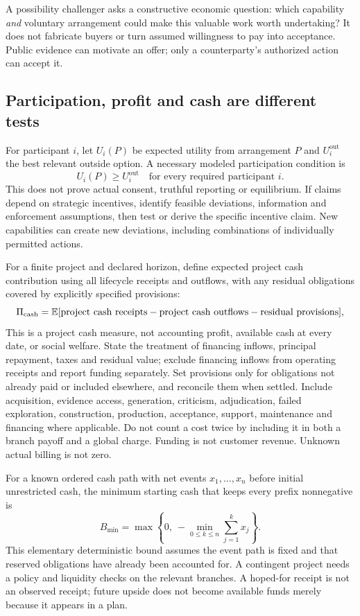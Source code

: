 A possibility challenger asks a constructive economic question: which capability \emph{and} voluntary arrangement could make this valuable work worth undertaking? It does not fabricate buyers or turn assumed willingness to pay into acceptance. Public evidence can motivate an offer; only a counterparty's authorized action can accept it.

\subsection{Participation, profit and cash are different tests}
For participant $i$, let $U_i(P)$ be expected utility from arrangement $P$ and $U_i^{\mathrm{out}}$ the best relevant outside option. A necessary modeled participation condition is
\begin{equation}
U_i(P)\geq U_i^{\mathrm{out}}\quad\text{for every required participant }i.
\end{equation}
This does not prove actual consent, truthful reporting or equilibrium. If claims depend on strategic incentives, identify feasible deviations, information and enforcement assumptions, then test or derive the specific incentive claim. New capabilities can create new deviations, including combinations of individually permitted actions.

For a finite project and declared horizon, define expected project cash contribution using all lifecycle receipts and outflows, with any residual obligations covered by explicitly specified provisions:
\begin{equation}
\Pi_{\mathrm{cash}}=\mathbb{E}[\text{project cash receipts}-\text{project cash outflows}-\text{residual provisions}],
\end{equation}
This is a project cash measure, not accounting profit, available cash at every date, or social welfare. State the treatment of financing inflows, principal repayment, taxes and residual value; exclude financing inflows from operating receipts and report funding separately. Set provisions only for obligations not already paid or included elsewhere, and reconcile them when settled. Include acquisition, evidence access, generation, criticism, adjudication, failed exploration, construction, production, acceptance, support, maintenance and financing where applicable. Do not count a cost twice by including it in both a branch payoff and a global charge. Funding is not customer revenue. Unknown actual billing is not zero.

For a known ordered cash path with net events $x_1,\ldots,x_n$ before initial unrestricted cash, the minimum starting cash that keeps every prefix nonnegative is
\begin{equation}
B_{\min}=\max\left\{0,\ -\min_{0\leq k\leq n}\sum_{j=1}^{k}x_j\right\}.
\label{eq:cash}
\end{equation}
This elementary deterministic bound assumes the event path is fixed and that reserved obligations have already been accounted for. A contingent project needs a policy and liquidity checks on the relevant branches. A hoped-for receipt is not an observed receipt; future upside does not become available funds merely because it appears in a plan.

